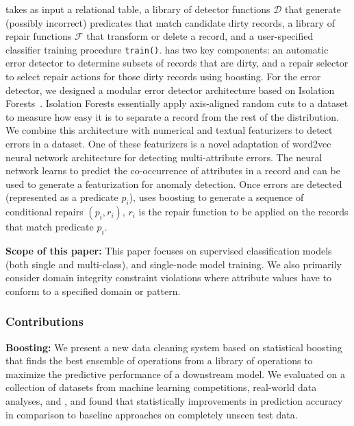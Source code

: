\sys takes as input a relational table, a library of detector functions $\mathcal{D}$ that generate (possibly incorrect) predicates that match candidate dirty records, a library of repair functions $\mathcal{F}$ that transform or delete a record, and a user-specified classifier training procedure \texttt{train()}.
\sys has two key components: an automatic error detector to determine subsets of records that are dirty, and a repair selector to select repair actions for those dirty records using boosting.
For the error detector, we designed a modular error detector architecture based on Isolation Forests~\cite{liu2008isolation}.
Isolation Forests essentially apply axis-aligned random cuts to a dataset to measure how easy it is to separate a record from the rest of the distribution.
We combine this architecture with numerical and textual featurizers to detect errors in a dataset.
One of these featurizers is a novel adaptation of \textsf{word2vec} neural network architecture for detecting multi-attribute errors.
The neural network learns to predict the co-occurrence of attributes in a record and can be used to generate a featurization for anomaly detection.
Once errors are detected (represented as a predicate $p_i$), \sys uses boosting to generate a sequence of conditional repairs $(p_i, r_i)$,  $r_i$ is the repair function to be applied on the records that match predicate $p_i$.

\vspace{0.5em}\noindent\textbf{Scope of this paper: } This paper focuses on supervised classification models (both single and multi-class), and single-node model training.
We also primarily consider domain integrity constraint violations where attribute values have to conform to a specified domain or pattern.

\subsubsection*{Contributions}

\vspace{0.5em}\noindent\textbf{Boosting: } We present a new data cleaning system based on statistical boosting that finds the best ensemble of operations from a library of operations to maximize the predictive performance of a downstream model. We evaluated \sys on a collection of datasets from machine learning competitions, real-world data analyses, and \company, and found that statistically improvements in prediction accuracy in comparison to baseline approaches on completely unseen test data. 

